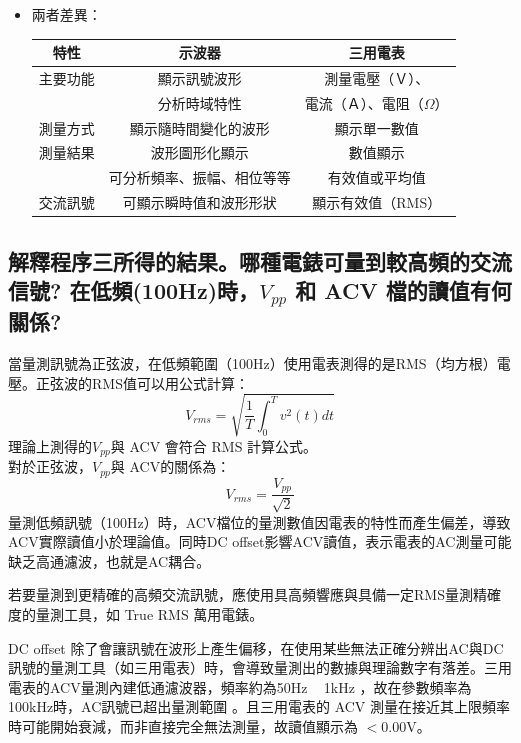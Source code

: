 \documentclass[12pt,a4paper]{article}
\begin{document}
\begin{CJK}{UTF8}{bkai}
\begin{itemize}
    \item 兩者差異：
    \begin{center}
        \begin{tabular}{c|c|c}
         特性 &   示波器 &   三用電表  \\
         \hline
         \hline
         主要功能   &   顯示訊號波形   & 測量電壓（Ｖ）、\\
            &   分析時域特性  &   電流（Ａ）、電阻（$\Omega$）\\
        \hline
        測量方式    &   顯示隨時間變化的波形  &   顯示單一數值\\
        \hline
        測量結果    &   波形圖形化顯示 &   數值顯示\\
            &   可分析頻率、振幅、相位等等   &   有效值或平均值\\
        \hline
        交流訊號    &   可顯示瞬時值和波形形狀 &   顯示有效值（RMS）\\
        \hline
    \end{tabular}
    \end{center}
    
\end{itemize}

\subsection{解釋程序三所得的結果。哪種電錶可量到較高頻的交流信號? 在低頻(100Hz)時，$V_{pp}$ 和 ACV 檔的讀值有何關係?}\label{subsec:3}
\hfill

當量測訊號為正弦波，在低頻範圍（100Hz）使用電表測得的是RMS（均方根）電壓。正弦波的RMS值可以用公式計算：
\begin{equation}
    V_{rms} = \sqrt{\frac{1}{T}\int^{T}_{0}v^{2}(t)dt}        
\end{equation}
理論上測得的$V_{pp}$與 ACV 會符合 RMS 計算公式。\\
對於正弦波，$V_{pp}$與 ACV的關係為：
\begin{equation}
    V_{rms} = \frac{V_{pp}}{\sqrt{2}}
\end{equation}
量測低頻訊號（100Hz）時，ACV檔位的量測數值因電表的特性而產生偏差，導致ACV實際讀值小於理論值。同時DC offset影響ACV讀值，表示電表的AC測量可能缺乏高通濾波，也就是AC耦合。

若要量測到更精確的高頻交流訊號，應使用具高頻響應與具備一定RMS量測精確度的量測工具，如 True RMS 萬用電錶。

DC offset 除了會讓訊號在波形上產生偏移，在使用某些無法正確分辨出AC與DC訊號的量測工具（如三用電表）時，會導致量測出的數據與理論數字有落差。三用電表的ACV量測內建低通濾波器，頻率約為50Hz ~ 1kHz ，故在參數頻率為100kHz時，AC訊號已超出量測範圍 。且三用電表的 ACV 測量在接近其上限頻率時可能開始衰減，而非直接完全無法測量，故讀值顯示為 $<$0.00V。


\end{CJK}
\end{document}

